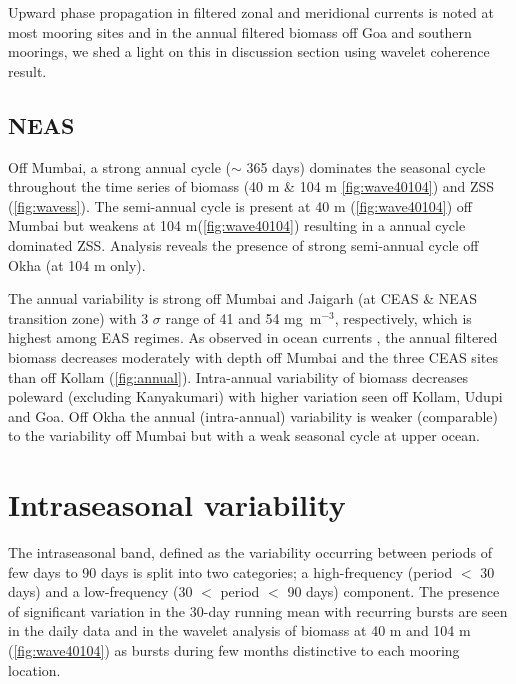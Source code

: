 \documentclass{article}
\begin{document}
	Upward phase propagation in filtered zonal and meridional currents is noted at most mooring sites \citep{amol2014observed} and in the annual filtered biomass off Goa and southern moorings, we shed a light on this in discussion section using wavelet coherence result.
	
	
	\subsection{NEAS}
	Off Mumbai, a strong annual cycle ($\sim$ 365 days) dominates the seasonal cycle throughout the time series of biomass (40 m \& 104 m \cref{fig:wave40104}) and ZSS (\cref{fig:wavess}). The semi-annual cycle is present at 40 m (\cref{fig:wave40104}) off Mumbai but weakens at 104 m(\cref{fig:wave40104}) resulting in a annual cycle dominated ZSS. Analysis reveals the presence of strong semi-annual cycle off Okha (at 104 m only). 
	
	The annual variability is strong off Mumbai and Jaigarh (at CEAS \& NEAS transition zone) with 3 $\sigma$ range of 41 and
	54 mg~m$^{-3}$, respectively, which is highest among EAS regimes.  As observed in ocean currents \citep{amol2014observed, chaudhuri2020observed}, the annual filtered biomass decreases moderately with depth off Mumbai and the three CEAS sites than off Kollam (\cref{fig:annual}). Intra-annual variability of biomass decreases poleward (excluding Kanyakumari) with higher variation seen off Kollam, Udupi and Goa. Off Okha the annual (intra-annual) variability is weaker (comparable) to the variability off Mumbai but with a weak seasonal cycle at upper ocean.
	
	
	\section{Intraseasonal variability}
	The intraseasonal band, defined as the variability occurring between periods of few days to 90 days is split into two categories; a high-frequency (period $<$ 30 days) and a low-frequency (30 $<$ period $<$ 90 days) component. The presence of significant variation in the 30-day running mean with recurring bursts are seen in the daily data and in the  wavelet analysis of biomass at 40 m and 104 m (\cref{fig:wave40104}) as bursts during few months distinctive to each mooring location.  
\end{document}
